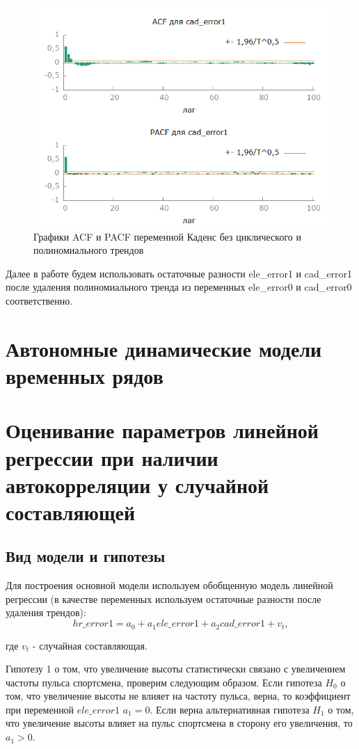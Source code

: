\documentclass[a4paper,12pt]{article}
\begin{document}
\begin{figure}[H]
	\centering
	\includegraphics[width=0.5\linewidth]{../[graphics]/cad_error1_acf_100.png}
	\caption{Графики ACF и PACF переменной Каденс без циклического и полиномиального трендов}
	\label{fig:cad_error1_acf_100}
\end{figure}

Далее в работе будем использовать остаточные разности ele\_error1 и cad\_error1 после удаления полиномиального тренда из переменных ele\_error0 и cad\_error0 соответственно.

\section{Автономные динамические модели временных рядов}



\section{Оценивание параметров линейной регрессии при наличии автокорреляции у случайной составляющей}

\subsection{Вид модели и гипотезы}
Для построения основной модели используем обобщенную модель линейной регрессии (в качестве переменных используем остаточные разности после удаления трендов):
\[hr\_error1 = a_0 + a_1 ele\_error1 + a_2 cad\_error1 + v_t,\]

где $v_t$ - случайная составляющая.

Гипотезу 1 о том, что увеличение высоты статистически связано с увеличением частоты пульса спортсмена, проверим следующим образом. Если гипотеза $H_0$ о том, что увеличение высоты не влияет на частоту пульса, верна, то коэффициент при переменной $ele\_error1$ $a_1 = 0$. Если верна альтернативная гипотеза $H_1$ о том, что увеличение высоты влияет на пульс спортсмена в сторону его увеличения, то $a_1 > 0$.
\end{document}
